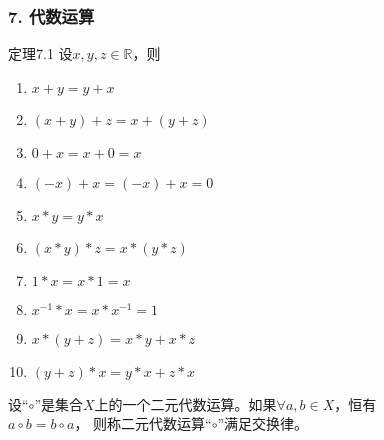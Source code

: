\documentclass{beamer}
\begin{document}
\begin{CJK*}{UTF8}{gbsn}
\begin{frame}
  \frametitle{7. 代数运算}
  \begin{minipage}[t]{0.49\linewidth}
  \begin{block}{定理7.1}
    设$x, y, z \in \mathbb{R}$，则
   \begin{enumerate}
   \item   $x + y = y + x$
   \item   $(x + y) + z = x + (y + z)$
   \item   $0 + x = x + 0 = x$
   \item   $(-x) + x = (-x) + x = 0$
   \item   $x * y = y * x$
   \item   $(x * y) * z = x * (y *z)$
   \item   $1 * x = x * 1 = x$
   \item   $x^{-1} * x = x * x^{-1} = 1$
   \item   $x* (y + z) = x * y + x * z$
   \item   $(y + z) * x = y * x + z * x$
    \end{enumerate}
  \end{block}\pause
\end{minipage}
\begin{minipage}[t]{0.49\linewidth}
  \begin{Def}
    设“$\circ$”是集合$X$上的一个二元代数运算。如果$\forall a, b \in X$，恒有\\$a \circ b = b \circ a$， 则称二元代数运算“$\circ$”满足\alert{交换律}。
  \end{Def}
\end{minipage}
\end{frame}


\end{CJK*}
\end{document}
